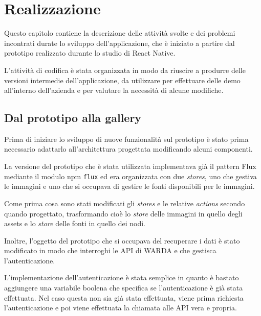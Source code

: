 
\chapter{Realizzazione}
\label{cap:realizzazione}

Questo capitolo contiene la descrizione delle attività svolte e dei problemi incontrati durate lo sviluppo dell'applicazione, che è iniziato a partire dal prototipo realizzato durante lo studio di React Native.

L'attività di codifica è stata organizzata in modo da riuscire a produrre delle versioni intermedie dell'applicazione, da utilizzare per effettuare delle demo all'interno dell'azienda e per valutare la necessità di alcune modifiche.

\section{Dal prototipo alla gallery}

Prima di iniziare lo sviluppo di nuove funzionalità sul prototipo è stato prima necessario adattarlo all'architettura progettata modificando alcuni componenti.

La versione del prototipo che è stata utilizzata implementava già il pattern Flux mediante il modulo npm \texttt{flux} ed era organizzata con due \textit{stores}, uno che gestiva le immagini e uno che si occupava di gestire le fonti disponibili per le immagini.

Come prima cosa sono stati modificati gli \textit{stores} e le relative \textit{actions} secondo quando progettato, trasformando cioè lo \textit{store} delle immagini in quello degli assets e lo \textit{store} delle fonti in quello dei nodi.

Inoltre, l'oggetto del prototipo che si occupava del recuperare i dati è stato modificato in modo che interroghi le API di WARDA e che gestisca l'autenticazione.

L'implementazione dell'autenticazione è stata semplice in quanto è bastato aggiungere una variabile boolena che specifica se l'autenticazione è già stata effettuata. Nel caso questa non sia già stata effettuata, viene prima richiesta l'autenticazione e poi viene effettuata la chiamata alle API vera e propria.

